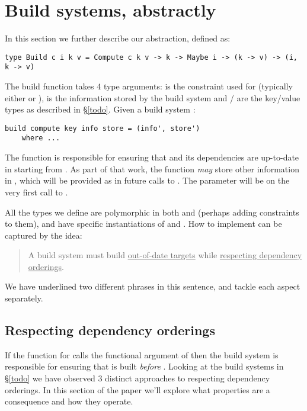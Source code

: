 \section{Build systems, abstractly}\label{sec-build}

In this section we further describe our  abstraction, defined as:

\begin{verbatim}
type Build c i k v = Compute c k v -> k -> Maybe i -> (k -> v) -> (i, k -> v)
\end{verbatim}

The build function takes 4 type arguments:  is the constraint used for  (typically either  or ),  is the information stored by the build system and / are the key/value types as described in \S\ref{todo}. Given a build system :

\begin{verbatim}
build compute key info store = (info', store')
    where ...
\end{verbatim}

The function  is responsible for ensuring that  and its dependencies are up-to-date in  starting from . As part of that work, the  function \textit{may} store other information in , which will be provided as  in future calls to . The  parameter will be  on the very first call to .

All the  types we define are polymorphic in both  and  (perhaps adding constraints to them), and have specific instantiations of  and . How to implement  can be captured by the idea:

\begin{quote}
A build system must build \underline{out-of-date targets} while \underline{respecting dependency orderings}.
\end{quote}

We have underlined two different phrases in this sentence, and tackle each aspect separately.


\subsection{Respecting dependency orderings}

If the  function for  calls the functional argument of  then the build system is responsible for ensuring that  is built \textit{before} . Looking at the build systems in \S\ref{todo} we have observed 3 distinct approaches to respecting dependency orderings. In this section of the paper we'll explore what properties are a consequence and how they operate.

